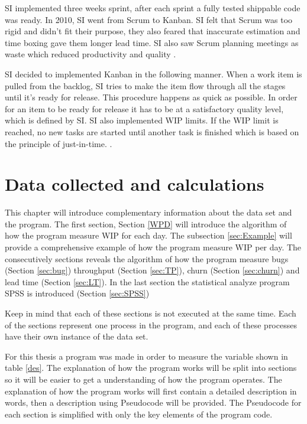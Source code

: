 \documentclass[UKenglish]{ifimaster}  %
\begin{document}
SI implemented three weeks sprint, after each sprint a fully tested shippable code was ready. In 2010, SI went from Scrum to Kanban. SI felt that Scrum was too rigid and didn't fit their purpose, they also feared that inaccurate estimation and time boxing gave them longer lead time. SI also saw Scrum planning meetings as waste which reduced productivity and quality \parencite{Dag}. 

SI decided to implemented Kanban in the following manner. When a work item is pulled from the backlog, SI tries to make the item flow through all the stages until it's ready for release. This procedure happens as quick as possible. In order for an item to be ready for release it has to be at a satisfactory quality level, which is defined by SI. SI also implemented WIP limits. If the WIP limit is reached, no new tasks are started until another task is finished which is based on the principle of just-in-time. \parencite{Dag}.



\chapter{Data collected and calculations}
\label{ch:DCC}
This chapter will introduce complementary information about the data set and the program. The first section, Section \ref{WPD} will introduce the algorithm of how the program measure WIP for each day. The subsection \ref{sec:Example} will provide a comprehensive example of how the program measure WIP per day. The consecutively sections reveals the algorithm of how the program measure bugs (Section \ref{sec:bug}) throughput (Section \ref{sec:TP}),  churn (Section \ref{sec:churn}) and lead time (Section \ref{sec:LT}). In the last section the statistical analyze program SPSS is introduced (Section \ref{sec:SPSS})

Keep in mind that each of these sections is not executed at the same time. Each of the sections represent one process in the program, and each of these processes have their own instance of the data set.


For this thesis a program was made in order to measure the variable shown in table \ref{des}. The explanation of how the program works will be split into sections so it will be easier to get a understanding of how the program operates. The explanation of how the program works will first contain a detailed description in words, then a description using Pseudocode \parencite{jd} will be provided. The Pseudocode for each section is simplified with only the key elements of the program code. 
\end{document}
